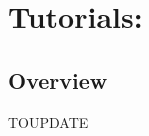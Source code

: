 
\cleardoublepage
\chapter{Tutorials: \daydate}
\thispagestyle{emptyheader}
\setlength{\parindent}{0in}
\setlength{\parskip}{2ex}
\renewcommand{\baselinestretch}{0.87}

\newcommand{\tutorialtimea}{6:00--9:30}
\newcommand{\tutorialtimeb}{10:30--14:00}
\newcommand{\tutorialtimec}{15:00--18:30}
\newcommand{\tutorialtimezone}{(Seattle, Pacific Daytime Time, UTC/GMT-7)}
\newcommand{\tutol}{\hspace{-.25in}}

\section*{Overview}
TOUPDATE
\renewcommand{\arraystretch}{1.2}

